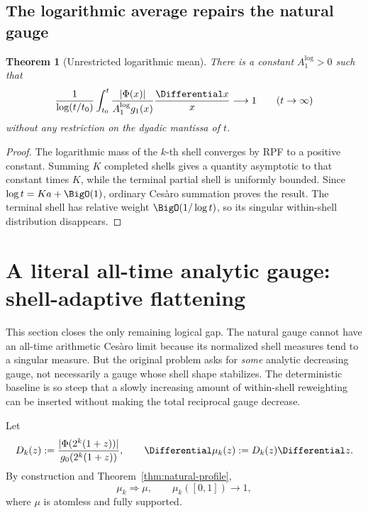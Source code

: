 \documentclass[11pt]{article}
\newtheorem{theorem}{Theorem}[section]
\theoremstyle{definition}
\theoremstyle{remark}
\begin{document}
\subsection{The logarithmic average repairs the natural gauge}

\begin{theorem}[Unrestricted logarithmic mean]
\label{thm:logmean}
There is a constant \(A_1^{\log}>0\) such that
\begin{equation}
 \frac1{\log(t/t_0)}\int_{t_0}^{t}
 \frac{|\Phi(x)|}{A_1^{\log}g_1(x)}\frac{\Differential x}{x}
 \longrightarrow1
 \qquad(t\to\infty)
 \label{eq:logmean}
\end{equation}
without any restriction on the dyadic mantissa of \(t\).
\end{theorem}

\begin{proof}
The logarithmic mass of the \(k\)-th shell converges by RPF to a positive
constant.  Summing \(K\) completed shells gives a quantity asymptotic to that
constant times \(K\), while the terminal partial shell is uniformly bounded.
Since \(\log t=Ka+\BigO(1)\), ordinary Ces\`aro summation proves the result.
The terminal shell has relative weight \(\BigO(1/\log t)\), so its singular
within-shell distribution disappears.
\end{proof}

\section{A literal all-time analytic gauge: shell-adaptive flattening}
\label{sec:adaptive}

This section closes the only remaining logical gap.  The natural gauge cannot
have an all-time arithmetic Ces\`aro limit because its normalized shell
measures tend to a singular measure.  But the original problem asks for
\emph{some} analytic decreasing gauge, not necessarily a gauge whose shell
shape stabilizes.  The deterministic baseline is so steep that a slowly
increasing amount of within-shell reweighting can be inserted without making
the total reciprocal gauge decrease.

Let
\begin{equation}
 D_k(z):=\frac{|\Phi(2^k(1+z))|}{g_0(2^k(1+z))},
 \qquad
 \Differential\mu_k(z):=D_k(z)\Differential z.
 \label{eq:muk}
\end{equation}
By construction and Theorem~\ref{thm:natural-profile},
\begin{equation}
 \mu_k\Longrightarrow\mu,
 \qquad \mu_k([0,1])\longrightarrow1,
 \label{eq:muk-conv}
\end{equation}
where \(\mu\) is atomless and fully supported.
\end{document}
